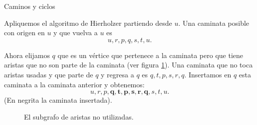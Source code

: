 \begin{section}{Caminos y ciclos}
\begin{ejemplo*}
Apliquemos el algoritmo de Hierholzer partiendo  desde $u$. Una caminata posible con origen en $u$ y que vuelva a $u$ es $$u, r, p, q, s, t, u.$$


Ahora elijamos $q$ que es un vértice que pertenece a la caminata pero que tiene aristas que no son parte de la caminata (ver figura \ref{f5.7.1b}). Una caminata que no toca aristas usadas y  que parte de $q$ y regresa a $q$ es $q,t,p,s,r,q$.  
Insertamos en $q$  esta caminata  a la caminata anterior y obtenemos:
$$u, r, p, \mathbf{q,t,p,s,r,q}, s, t, u.$$
(En  negrita la caminata insertada).
\end{ejemplo*}


\begin{figure}[ht]
    \begin{center}
    \end{center}
    \caption{El subgrafo de aristas no utilizadas.} \label{f5.7.1b}
\end{figure}

\begin{comment}
\begin{observacion*} Escribiremos en pseudocódigo el algoritmo para hallar una caminata o circuito euleriano en un grafo $G$ con $n$ vértices  de valencia par.
    
Como ya mencionamos anteriormente, a un grafo $G$ lo representaremos por una lista de adyacencia. Supongamos que los vértices de $G$ son $0,\ldots,k$,  entonces $G[i] = [i_0,i_1,\ldots]$ serán los vértices adyacentes al vértice $i$. Tomamos como comienzo del recorrido el vértice arbitrario $0$.






\end{comment}
\end{section}
